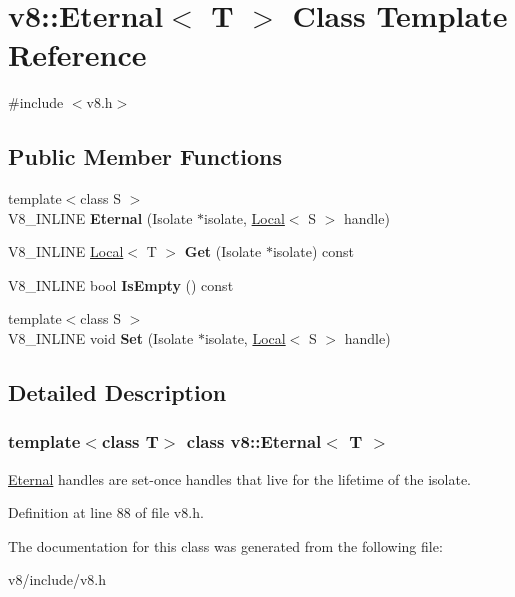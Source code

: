 \hypertarget{classv8_1_1Eternal}{}\section{v8\+:\+:Eternal$<$ T $>$ Class Template Reference}
\label{classv8_1_1Eternal}


{\ttfamily \#include $<$v8.\+h$>$}

\subsection*{Public Member Functions}
\begin{DoxyCompactItemize}
\item 
\mbox{\label{classv8_1_1Eternal_ad7522d8b51e072dcbc4261bc1f155bcb}} 
{\footnotesize template$<$class S $>$ }\\V8\+\_\+\+I\+N\+L\+I\+NE {\bfseries Eternal} (Isolate $\ast$isolate, \mbox{\hyperlink{classv8_1_1Local}{Local}}$<$ S $>$ handle)
\item 
\mbox{\label{classv8_1_1Eternal_a2a615f9cdc8ae38d2380065488c2a397}} 
V8\+\_\+\+I\+N\+L\+I\+NE \mbox{\hyperlink{classv8_1_1Local}{Local}}$<$ T $>$ {\bfseries Get} (Isolate $\ast$isolate) const
\item 
\mbox{\label{classv8_1_1Eternal_a7548826960a4f34ee36947f4fa3765d7}} 
V8\+\_\+\+I\+N\+L\+I\+NE bool {\bfseries Is\+Empty} () const
\item 
\mbox{\label{classv8_1_1Eternal_a75a32f5c428a0d47e13f66dbdeb9adba}} 
{\footnotesize template$<$class S $>$ }\\V8\+\_\+\+I\+N\+L\+I\+NE void {\bfseries Set} (Isolate $\ast$isolate, \mbox{\hyperlink{classv8_1_1Local}{Local}}$<$ S $>$ handle)
\end{DoxyCompactItemize}


\subsection{Detailed Description}
\subsubsection*{template$<$class T$>$\newline
class v8\+::\+Eternal$<$ T $>$}

\mbox{\hyperlink{classv8_1_1Eternal}{Eternal}} handles are set-\/once handles that live for the lifetime of the isolate. 

Definition at line 88 of file v8.\+h.



The documentation for this class was generated from the following file\+:\begin{DoxyCompactItemize}
\item 
v8/include/v8.\+h\end{DoxyCompactItemize}
